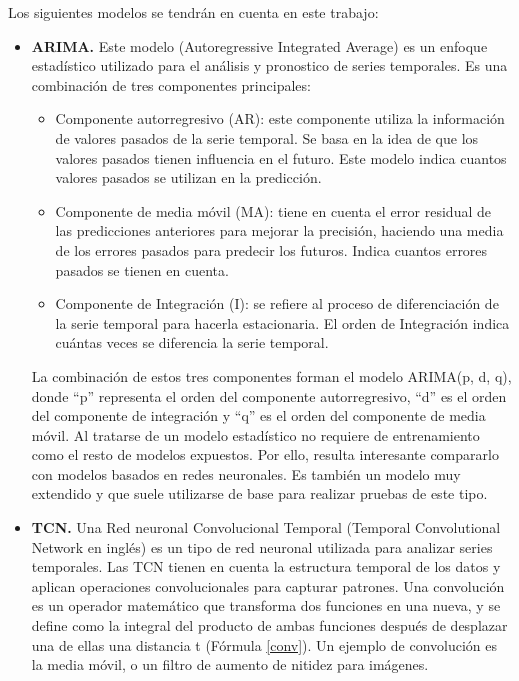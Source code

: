 Los siguientes modelos se tendrán en cuenta en este trabajo:
\begin{itemize}
    \item \textbf{ARIMA.} Este modelo (Autoregressive Integrated Average) \cite{hyndman2018forecasting} es un enfoque estadístico utilizado para 
        el análisis y pronostico de series temporales. Es una combinación de tres componentes principales:
        \begin{itemize}
            \item Componente autorregresivo (AR): este componente utiliza la información de valores pasados de la
                serie temporal. Se basa en la idea de que los valores pasados tienen influencia en el futuro. Este 
                modelo indica cuantos valores pasados se utilizan en la predicción.
            \item Componente de media móvil (MA): tiene en cuenta el error residual de las predicciones anteriores 
                para mejorar la precisión, haciendo una media de los errores pasados para predecir los futuros. 
                Indica cuantos errores pasados se tienen en cuenta.
            \item Componente de Integración (I): se refiere al proceso de diferenciación de la serie temporal para 
                hacerla estacionaria. El orden de Integración indica cuántas veces se diferencia la serie temporal.
        \end{itemize}
        La combinación de estos tres componentes forman el modelo ARIMA(p, d, q), donde ``p'' representa el orden 
        del componente autorregresivo, ``d'' es el orden del componente de integración y ``q'' es el orden del componente 
        de media móvil.
        Al tratarse de un modelo estadístico no requiere de entrenamiento como el resto de modelos expuestos. Por ello, 
        resulta interesante compararlo con modelos basados en redes neuronales. Es también un modelo muy extendido y 
        que suele utilizarse de base para realizar pruebas de este tipo.
    \item \textbf{TCN.} Una Red neuronal Convolucional Temporal (Temporal Convolutional Network en inglés) \cite{DBLP:journals/corr/abs-1803-01271} es un tipo de 
        red neuronal utilizada para analizar series temporales. Las TCN tienen en cuenta la estructura temporal de los datos 
        y aplican operaciones convolucionales para capturar patrones. Una convolución \cite{hirschman2012convolution} es un operador matemático que transforma 
        dos funciones en una nueva, y se define como la integral del producto de ambas funciones después de desplazar una de ellas 
        una distancia t (Fórmula \ref{conv}). Un ejemplo de convolución es la media móvil, o un filtro de aumento de nitidez para imágenes.


\end{itemize}
